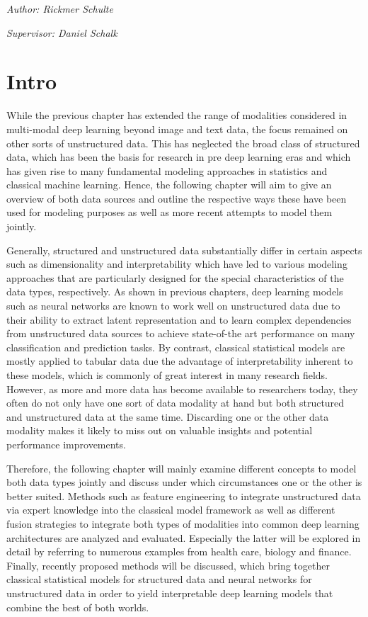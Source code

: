 \documentclass[
]{krantz}
\begin{document}
\emph{Author: Rickmer Schulte}

\emph{Supervisor: Daniel Schalk}

\hypertarget{intro-1}{%
\section{Intro}\label{intro-1}}

While the previous chapter has extended the range of modalities considered in multi-modal deep learning beyond image and text data, the focus remained on other sorts of unstructured data. This has neglected the broad class of structured data, which has been the basis for research in pre deep learning eras and which has given rise to many fundamental modeling approaches in statistics and classical machine learning. Hence, the following chapter will aim to give an overview of both data sources and outline the respective ways these have been used for modeling purposes as well as more recent attempts to model them jointly.

Generally, structured and unstructured data substantially differ in certain aspects such as dimensionality and interpretability which have led to various modeling approaches that are particularly designed for the special characteristics of the data types, respectively. As shown in previous chapters, deep learning models such as neural networks are known to work well on unstructured data due to their ability to extract latent representation and to learn complex dependencies from unstructured data sources to achieve state-of-the art performance on many classification and prediction tasks. By contrast, classical statistical models are mostly applied to tabular data due the advantage of interpretability inherent to these models, which is commonly of great interest in many research fields. However, as more and more data has become available to researchers today, they often do not only have one sort of data modality at hand but both structured and unstructured data at the same time. Discarding one or the other data modality makes it likely to miss out on valuable insights and potential performance improvements.

Therefore, the following chapter will mainly examine different concepts to model both data types jointly and discuss under which circumstances one or the other is better suited. Methods such as feature engineering to integrate unstructured data via expert knowledge into the classical model framework as well as different fusion strategies to integrate both types of modalities into common deep learning architectures are analyzed and evaluated. Especially the latter will be explored in detail by referring to numerous examples from health care, biology and finance. Finally, recently proposed methods will be discussed, which bring together classical statistical models for structured data and neural networks for unstructured data in order to yield interpretable deep learning models that combine the best of both worlds.
\end{document}
